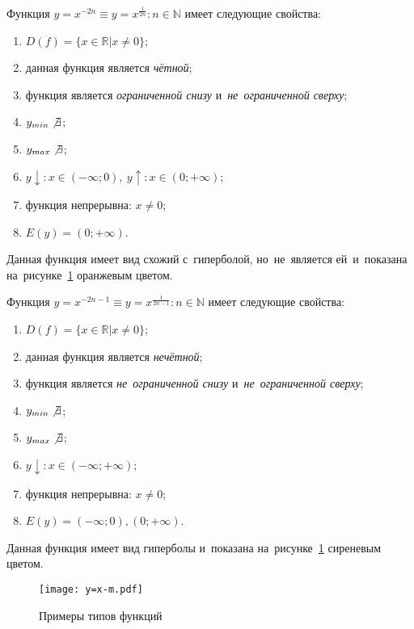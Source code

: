 \documentclass[]{scrartcl}
\begin{document}
{{Функция ${\textstyle y=x^{-2n} \equiv y=x^{\frac{1}{2n}} : n \in \mathbb{N}}$ имеет следующие свойства:
\begin{enumerate}
	\item ${\textstyle D(f)=\{x \in \mathbb{R} | x \neq 0\}}$;
	\item данная функция является \emph{чётной};
	\item функция является \emph{ограниченной снизу} и~\emph{не~ограниченной сверху};
	\item ${\textstyle y_{min}\not \exists}$;
	\item ${\textstyle y_{max}\not \exists}$;
	\item ${\textstyle y\downarrow:x\in (-\infty;0),\ y\uparrow:x\in (0;+\infty)}$;
	\item функция непрерывна: ${\textstyle x \neq 0}$;
	\item ${\textstyle E(y)=(0;+\infty)}$.
\end{enumerate}
Данная функция имеет вид схожий с~гиперболой, но~не~является ей~и~показана на~рисунке~\ref{fig:y=x^m} оранжевым цветом.

Функция ${\textstyle y=x^{-2n-1} \equiv y=x^{\frac{1}{2n-1}} : n \in \mathbb{N}}$ имеет следующие свойства:
\begin{enumerate}
	\item ${\textstyle D(f)=\{x \in \mathbb{R} | x \neq 0\}}$;
	\item данная функция является \emph{нечётной};
	\item функция является \emph{не~ограниченной снизу} и~\emph{не~ограниченной сверху};
	\item ${\textstyle y_{min}\not \exists}$;
	\item ${\textstyle y_{max}\not \exists}$;
	\item ${\textstyle y\downarrow:x\in (-\infty;+\infty)}$;
	\item функция непрерывна: ${\textstyle x \neq 0}$;
	\item ${\textstyle E(y)=(-\infty;0),(0;+\infty)}$.
\end{enumerate}
Данная функция имеет вид гиперболы и~показана на~рисунке~\ref{fig:y=x^m} сиреневым цветом.

\begin{figure}[ht]
	\centering %
	\texttt{[image: y=x-m.pdf]}
	\caption{Примеры типов функций}\label{fig:y=x^m}
\end{figure}

}}
\end{document}
